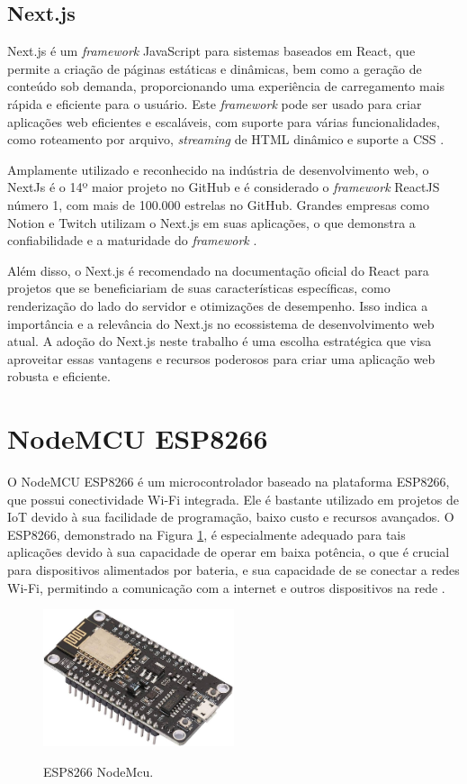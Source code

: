\subsection{Next.js}

Next.js é um \textit{framework} JavaScript para sistemas baseados em React, que permite a criação de páginas estáticas e dinâmicas, bem como a geração de conteúdo sob demanda, proporcionando uma experiência de carregamento mais rápida e eficiente para o usuário. Este \textit{framework} pode ser usado para criar aplicações web eficientes e escaláveis, com suporte para várias funcionalidades, como roteamento por arquivo, \textit{streaming} de HTML dinâmico e suporte a CSS \cite{Nextjs2023}.

Amplamente utilizado e reconhecido na indústria de desenvolvimento web, o NextJs é o 14º maior projeto no GitHub e é considerado o \textit{framework} ReactJS número 1, com mais de 100.000 estrelas no GitHub. Grandes empresas como Notion e Twitch utilizam o Next.js em suas aplicações, o que demonstra a confiabilidade e a maturidade do \textit{framework} \cite{Vercel2023}.

Além disso, o Next.js é recomendado na documentação oficial do React para projetos  que se beneficiariam de suas características específicas, como renderização do lado do servidor e otimizações de desempenho. Isso indica a importância e a relevância do Next.js no ecossistema de desenvolvimento web atual. A adoção do Next.js neste trabalho é uma escolha estratégica que visa aproveitar essas vantagens e recursos poderosos para criar uma aplicação web robusta e eficiente.

\section{NodeMCU ESP8266}

O NodeMCU ESP8266 é um microcontrolador baseado na plataforma ESP8266, que possui conectividade Wi-Fi integrada. Ele é bastante utilizado em projetos de \gls{IoT} devido à sua facilidade de programação, baixo custo e recursos avançados. O ESP8266, demonstrado na Figura \ref{fig:node}, é especialmente adequado para tais aplicações devido à sua capacidade de operar em baixa potência, o que é crucial para dispositivos alimentados por bateria, e sua capacidade de se conectar a redes Wi-Fi, permitindo a comunicação com a internet e outros dispositivos na rede  \cite{Kolban2016}.

\begin{figure}[h]
\centering
\caption{ESP8266 NodeMcu.}
\includegraphics[width=0.5\textwidth]{figuras/nodemcu.jpg}
\label{fig:node}
\end{figure}

